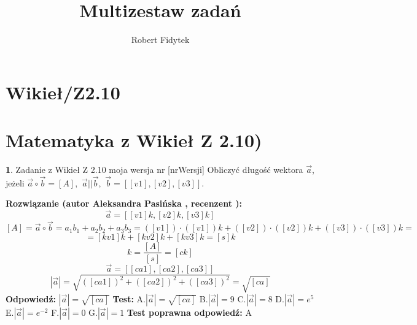 \documentclass[12pt, a4paper]{article}
\title{Multizestaw zadań}
\author{Robert Fidytek}
\date{}
\theoremstyle{definition} %
\newtheorem{zad}{}
\newcommand{\kategoria}[1]{\section{#1}} %
\newcommand{\zadStart}[1]{\begin{zad}#1\newline} %
\newcommand{\zadStop}{\end{zad}}   %
\newcommand{\rozwStart}[2]{\noindent \textbf{Rozwiązanie (autor #1 , recenzent #2): }\newline} %
\newcommand{\rozwStop}{\newline}                                            %
\newcommand{\odpStart}{\noindent \textbf{Odpowiedź:}\newline}    %
\newcommand{\odpStop}{\newline}                                             %
\newcommand{\testStart}{\noindent \textbf{Test:}\newline} %
\newcommand{\testStop}{\newline} %
\newcommand{\kluczStart}{\noindent \textbf{Test poprawna odpowiedź:}\newline} %
\newcommand{\kluczStop}{\newline} %
\begin{document}
\maketitle


\kategoria{Wikieł/Z2.10}
\kategoria{Matematyka z Wikieł Z 2.10)}
\zadStart{Zadanie z Wikieł Z 2.10 moja wersja nr [nrWersji]}
Obliczyć długość wektora $\vec a$, jeżeli $\vec a \circ \vec b=[A],$  $\vec a || \vec  b,$  $\vec b=[[v1],[v2],[v3]]$.
\zadStop
\rozwStart{Aleksandra Pasińska}{}
$$\vec a=[[v1]k,[v2]k,[v3]k]$$
$$[A]=\vec a \circ \vec b=a_1b_1+a_2b_2+a_3b_3=([v1])\cdot ([v1])k+([v2])\cdot ([v2])k+([v3])\cdot ([v3])k=$$ 
$$=[kv1]k+[kv2]k+[kv3]k=[s]k$$ 
$$k=\frac{[A]}{[s]}=[ck]$$
$$\vec a=[[ca1],[ca2],[ca3]]$$
$$|\vec a|=\sqrt{([ca1])^2+([ca2])^2+([ca3])^2}=\sqrt{[ca]}$$
\rozwStop
\odpStart
$|\vec a|=\sqrt{[ca]}$
\odpStop
\testStart
A.$|\vec a|=\sqrt{[ca]}$
B.$|\vec a|=9$
C.$|\vec a|=8$
D.$|\vec a|=e^{5}$
E.$|\vec a|=e^{-2}$
F.$|\vec a|=0$
G.$|\vec a|=1$
\testStop
\kluczStart
A
\kluczStop
\end{document}

